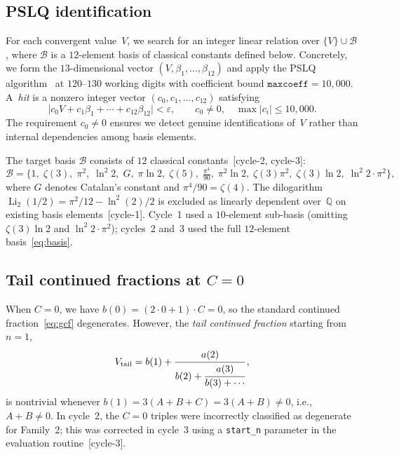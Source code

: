 \documentclass[11pt]{amsart}
\newcommand{\Q}{\mathbb{Q}}
\newcommand{\calB}{\mathcal{B}}
\theoremstyle{plain}
\theoremstyle{remark}
\begin{document}
\subsection{PSLQ identification}
For each convergent value~$V$, we search for an integer
linear relation over $\{V\} \cup \calB$, where $\calB$
is a $12$-element basis of classical constants defined below.
Concretely, we form the $13$-dimensional vector
$(V, \beta_1, \ldots, \beta_{12})$ and apply the PSLQ
algorithm~\cite{ferguson1999} at $120$--$130$ working digits
with coefficient bound $\texttt{maxcoeff} = 10{,}000$.
A~\emph{hit} is a nonzero integer vector
$(c_0, c_1, \ldots, c_{12})$ satisfying
\[
  \bigl|c_0 V + c_1 \beta_1 + \cdots + c_{12} \beta_{12}\bigr|
  < \varepsilon,
  \qquad c_0 \neq 0,
  \quad \max|c_i| \leq 10{,}000.
\]
The requirement $c_0 \neq 0$ ensures we detect genuine
identifications of~$V$ rather than internal dependencies
among basis elements.

The target basis $\calB$ consists of $12$ classical
constants~[cycle-2, cycle-3]:
\begin{equation}\label{eq:basis}
  \calB = \bigl\{
    1,\; \zeta(3),\; \pi^2,\; \ln^2\!2,\;
    G,\; \pi\ln 2,\; \zeta(5),\;
    \tfrac{\pi^4}{90},\;
    \pi^2\!\ln 2,\; \zeta(3)\pi^2,\;
    \zeta(3)\ln 2,\; \ln^2\!2 \cdot \pi^2
  \bigr\},
\end{equation}
where $G$ denotes Catalan's constant and
$\pi^4/90 = \zeta(4)$.
The dilogarithm $\operatorname{Li}_2(1/2) = \pi^2/12 - \ln^2(2)/2$
is excluded as linearly dependent over~$\Q$ on existing basis
elements~[cycle-1].
Cycle~1 used a $10$-element sub-basis (omitting
$\zeta(3)\ln 2$ and $\ln^2\!2 \cdot \pi^2$);
cycles~2 and~3 used the full $12$-element
basis~\eqref{eq:basis}.

\subsection{Tail continued fractions at $C = 0$}
When $C = 0$, we have $b(0) = (2 \cdot 0 + 1) \cdot C = 0$,
so the standard continued fraction~\eqref{eq:gcf} degenerates.
However, the \emph{tail continued fraction} starting from $n = 1$,
\[
  V_{\mathrm{tail}} = b(1) + \cfrac{a(2)}{b(2)
    + \cfrac{a(3)}{b(3) + \cdots}}\,,
\]
is nontrivial whenever $b(1) = 3(A + B + C) = 3(A+B) \neq 0$,
i.e., $A + B \neq 0$.
In cycle~2, the $C = 0$ triples were incorrectly classified as
degenerate for Family~2; this was corrected in cycle~3 using a
\texttt{start\_n} parameter in the evaluation
routine~[cycle-3].
\end{document}
